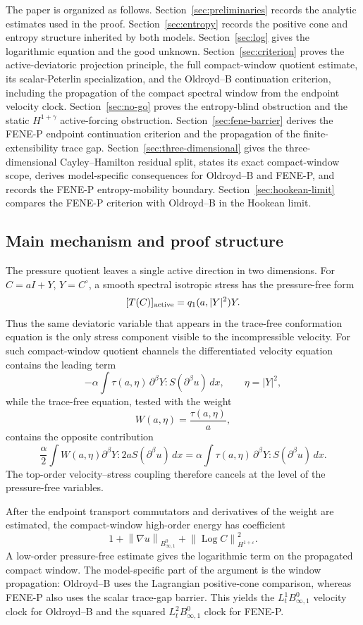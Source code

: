 \documentclass[11pt]{article}
\newcommand{\Log}{\operatorname{Log}}
\newcommand{\eps}{\varepsilon}
\newcommand{\norm}[1]{\left\lVert #1\right\rVert}
\begin{document}
The paper is organized as follows.  Section~\ref{sec:preliminaries} records the
analytic estimates used in the proof.  Section~\ref{sec:entropy} records the
positive cone and entropy structure inherited by both models.  Section~\ref{sec:log}
  gives the logarithmic equation and the good unknown.  Section~\ref{sec:criterion}
  proves the active-deviatoric projection principle, the full
  compact-window quotient estimate, its scalar-Peterlin specialization,
  and the Oldroyd--B continuation criterion, including
the propagation of the compact spectral window from the endpoint velocity
clock.  Section~\ref{sec:no-go} proves the entropy-blind obstruction and the
static \(H^{1+\gamma}\) active-forcing obstruction.
Section~\ref{sec:fene-barrier} derives the FENE-P endpoint continuation
criterion and the propagation of the
finite-extensibility trace gap.
Section~\ref{sec:three-dimensional} gives the three-dimensional
Cayley--Hamilton residual split, states its exact compact-window scope, derives
model-specific consequences for Oldroyd--B and FENE-P, and records the FENE-P
entropy-mobility boundary.
Section~\ref{sec:hookean-limit}
compares the FENE-P criterion with Oldroyd--B in the Hookean limit.

\subsection{Main mechanism and proof structure}

The pressure quotient leaves a single active direction in two dimensions.  For
\(C=aI+Y\), \(Y=C^\circ\), a smooth spectral isotropic stress has the
pressure-free form
\[
  [T(C)]_{\rm active}=q_1(a,|Y|^2)Y .
\]
Thus the same deviatoric variable that appears in the trace-free conformation
equation is the only stress component visible to the incompressible velocity.
For such compact-window quotient channels the differentiated velocity equation
contains the leading term
\[
  -\alpha\int \tau(a,\eta)\,\partial^\beta Y:S(\partial^\beta u)\,dx,
  \qquad \eta=|Y|^2,
\]
while the trace-free equation, tested with the weight
\[
  W(a,\eta)=\frac{\tau(a,\eta)}{a},
\]
contains the opposite contribution
\[
  \frac{\alpha}{2}\int W(a,\eta)\partial^\beta Y:2aS(\partial^\beta u)\,dx
  =
  \alpha\int \tau(a,\eta)\,\partial^\beta Y:S(\partial^\beta u)\,dx .
\]
The top-order velocity--stress coupling therefore cancels at the level of the
pressure-free variables.

After the endpoint transport commutators and derivatives of the weight are
estimated, the compact-window high-order energy has coefficient
\[
  1+\norm{\nabla u}_{B^0_{\infty,1}}
  +\norm{\Log C}_{H^{1+\eps}}^2 .
\]
A low-order pressure-free estimate gives the logarithmic term on the
propagated compact window.  The model-specific part of the argument is the
window propagation: Oldroyd--B uses the Lagrangian positive-cone comparison,
whereas FENE-P also uses the scalar trace-gap barrier.  This yields the
\(L^1_tB^0_{\infty,1}\) velocity clock for Oldroyd--B and the squared
\(L^2_tB^0_{\infty,1}\) clock for FENE-P.
\end{document}
